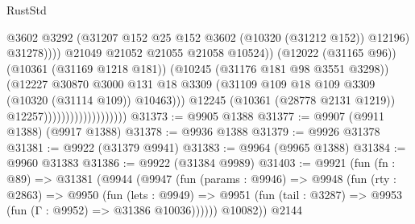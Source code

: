 \begin{lexlean}{RustStd}
\begin{coremodule}
                                                        @3602
                                                        @3292
                                                        (@31207
                                                          @152
                                                          @25
                                                          @152
                                                          @3602
                                                          (@10320 (@31212 @152))
                                                          @12196)
                                                        @31278))))
                                                @21049
                                                @21052
                                                @21055
                                                @21058
                                                @10524))
                                            (@12022 (@31165 @96))
                                            (@10361 (@31169 @1218 @181))
                                            (@10245 (@31176 @181 @98 @3551 @3298))
                                            (@12227
                                              @30870
                                              @3000
                                              @131
                                              @18
                                              @3309
                                              (@31109
                                                @109
                                                @18
                                                @109
                                                @3309
                                                (@10320 (@31114 @109))
                                                @10463)))
                                          @12245
                                          (@10361 (@28778 @2131 @1219))
                                          @12257)))))))))))))))))))
@31373 := @9905 @1388
@31377 := @9907 (@9911 @1388) (@9917 @1388)
@31378 := @9936 @1388
@31379 := @9926 @31378
@31381 := @9922 (@31379 @9941)
@31383 := @9964 (@9965 @1388)
@31384 := @9960 @31383
@31386 := @9922 (@31384 @9989)
@31403 := @9921
    (fun (fn : @89) =>
    @31381
      (@9944
        (@9947
          (fun (params : @9946) =>
          @9948
            (fun (rty : @2863) =>
            @9950
              (fun (lets : @9949) =>
              @9951 (fun (tail : @3287) => @9953 (fun (Γ : @9952) => @31386 @10036))))))
        @10082))
    @2144

\end{coremodule}
\end{lexlean}
